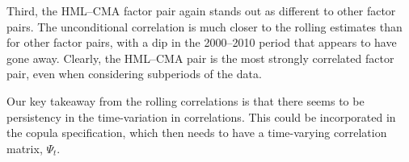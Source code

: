 Third, the HML--CMA factor pair again stands out as different to other factor pairs. The unconditional correlation is much closer to the rolling estimates than for other factor pairs, with a dip in the 2000--2010 period that appears to have gone away. Clearly, the HML--CMA pair is the most strongly correlated factor pair, even when considering subperiods of the data.

Our key takeaway from the rolling correlations is that there seems to be persistency in the time-variation in correlations. This could be incorporated in the copula specification, which then needs to have a time-varying correlation matrix, $\Psi_t$.




\label{sub:threshold_and_rolling_correlations_of_residuals}


